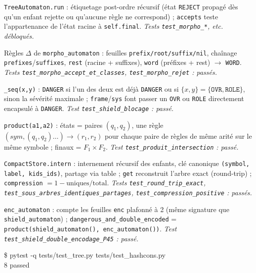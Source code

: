 \documentclass[11pt,a4paper]{scrartcl}
\begin{document}
\begin{description}[leftmargin=1.6em,style=nextline]
  \item[E3.1] \texttt{TreeAutomaton.run} : étiquetage post-ordre récursif
    (état \texttt{REJECT} propagé dès qu'un enfant rejette ou qu'aucune règle
    ne correspond) ; \texttt{accepts} teste l'appartenance de l'état racine à
    \texttt{self.final}. \emph{Tests \texttt{test\_morpho\_*}, etc. débloqués.}
  \item[E3.2] Règles $\Delta$ de \texttt{morpho\_automaton} : feuilles
    \texttt{prefix/root/suffix/nil}, chaînage \texttt{prefixes}/\texttt{suffixes},
    \texttt{rest} (racine + suffixes), \texttt{word} (préfixes + rest) $\to$
    \texttt{WORD}. \emph{Tests \texttt{test\_morpho\_accept\_et\_classes},
    \texttt{test\_morpho\_rejet} : passés.}
  \item[E3.3] \texttt{\_seq(x,y)} : \texttt{DANGER} si l'un des deux est déjà
    \texttt{DANGER} ou si $\{x,y\}=\{\texttt{OVR},\texttt{ROLE}\}$, sinon la
    sévérité maximale ; \texttt{frame}/\texttt{sys} font passer un
    \texttt{OVR} ou \texttt{ROLE} directement encapsulé à \texttt{DANGER}.
    \emph{Test \texttt{test\_shield\_blocage} : passé.}
  \item[E3.4] \texttt{product(a1,a2)} : états = paires $(q_1,q_2)$, une règle
    $(sym,(q_1,q_2)\dots)\to(r_1,r_2)$ pour chaque paire de règles de même
    arité sur le même symbole ; finaux = $F_1\times F_2$. \emph{Test
    \texttt{test\_produit\_intersection} : passé.}
  \item[E3.5] \texttt{CompactStore.intern} : internement récursif des
    enfants, clé canonique \texttt{(symbol, label, kids\_ids)}, partage via
    table ; \texttt{get} reconstruit l'arbre exact (round-trip) ;
    \texttt{compression} $=1-\text{uniques}/\text{total}$. \emph{Tests
    \texttt{test\_round\_trip\_exact}, \texttt{test\_sous\_arbres\_identiques\_partages},
    \texttt{test\_compression\_positive} : passés.}
  \item[E3.6 (bonus)] \texttt{enc\_automaton} : compte les feuilles
    \texttt{enc} plafonné à 2 (même signature que \texttt{shield\_automaton})
    ; \texttt{dangerous\_and\_double\_encoded} = \texttt{product(shield\_automaton(),
    enc\_automaton())}. \emph{Test \texttt{test\_shield\_double\_encodage\_P45} :
    passé.}
\end{description}

\begin{exemple}
\ttfamily \$ pytest -q tests/test\_tree.py tests/test\_hashcons.py\\ 8 passed
\end{exemple}
\end{document}

